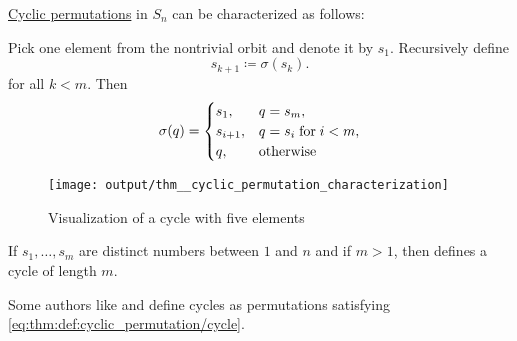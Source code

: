 \begin{proposition}\label{thm:cyclic_permutation_characterization}
  \hyperref[def:cyclic_permutation]{Cyclic permutations} in \( S_n \) can be characterized as follows:
  \begin{thmenum}
     Pick one element from the nontrivial orbit and denote it by \( s_1 \). Recursively define
    \begin{equation*}
      s_{k+1} \coloneqq \sigma(s_k).
    \end{equation*}
    for all \( k < m \). Then
    \begin{equation}\label{eq:thm:def:cyclic_permutation/cycle}
      \sigma(q) = \begin{cases}
        s_1,       &q = s_m, \\
        s_{i + 1}, &q = s_i \T{for} i < m, \\
        q,         &\T{otherwise}
      \end{cases}
    \end{equation}

    \begin{figure}
      \centering
      \texttt{[image: output/thm\_\_cyclic\_permutation\_characterization]}
      \caption{Visualization of a cycle with five elements}
      \label{fig:thm:cyclic_permutation_characterization}
    \end{figure}

     If \( s_1, \ldots, s_m \) are distinct numbers between \( 1 \) and \( n \) and if \( m > 1 \), then  defines a cycle of length \( m \).
  \end{thmenum}
\end{proposition}
\begin{comments}
  \item Some authors like  and  define cycles as permutations satisfying \cref{eq:thm:def:cyclic_permutation/cycle}.
\end{comments}

